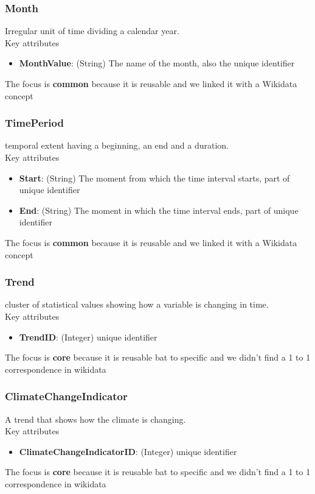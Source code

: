 \subsubsection{Month}
Irregular unit of time dividing a calendar year.\\
Key attributes
\begin{itemize}
    \item \textbf{MonthValue}: (String) The name of the month, also the unique identifier
\end{itemize}
The focus is \textbf{common} because it is reusable and we linked it with a Wikidata concept
\subsubsection{TimePeriod}
temporal extent having a beginning, an end and a duration.\\
Key attributes
\begin{itemize}
    \item \textbf{Start}: (String) The moment from which the time interval starts, part of unique identifier
    \item \textbf{End}: (String) The moment in which the time interval ends, part of unique identifier
\end{itemize}
The focus is \textbf{common} because it is reusable and we linked it with a Wikidata concept
\subsubsection{Trend}
cluster of statistical values showing how a variable is changing in time.\\
Key attributes
\begin{itemize}
    \item \textbf{TrendID}: (Integer)  unique identifier
\end{itemize}
The focus is \textbf{core} because it is reusable bat to specific and we didn't find a 1 to 1 correspondence in wikidata
\subsubsection{ClimateChangeIndicator}
A trend that shows how the climate is changing.\\
Key attributes
\begin{itemize}
    \item \textbf{ClimateChangeIndicatorID}: (Integer)  unique identifier
\end{itemize}
The focus is \textbf{core} because it is reusable bat to specific and we didn't find a 1 to 1 correspondence in wikidata
